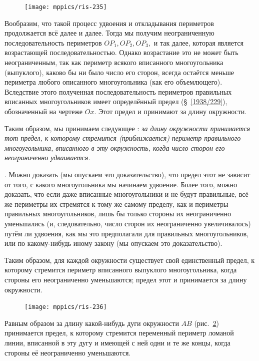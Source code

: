 \documentclass[oneside]{book}
\begin{document}
\begin{figure}[h!]
\centering
\texttt{[image: mppics/ris-235]}
\caption{}\label{1938/ris-235}
\end{figure}

Вообразим, что такой процесс удвоения и откладывания периметров продолжается всё далее и далее.
Тогда мы получим неограниченную последовательность периметров $OP_1, OP_2, OP_3,$ и так далее, которая является возрастающей последовательностью.
Однако возрастание это не может быть неограниченным, так как периметр всякого вписанного многоугольника (выпуклого), каково бы ни было число его сторон, всегда остаётся меньше периметра любого описанного многоугольника (как его объемлющего).
Вследствие этого полученная последовательность периметров правильных вписанных многоугольников имеет определённый предел (§~\ref{1938/229}), обозначенный на чертеже $Ox$.
Этот предел и принимают за длину окружности.

Таким образом, мы принимаем следующее :
\emph{за длину окружности принимается тот предел, к которому стремится (приближается) периметр правильного многоугольника, вписанного в эту окружность, когда число сторон его неограниченно удваивается.}

\smallskip
{}.
Можно доказать (мы опускаем это доказательство), что предел этот не зависит от того, с какого многоугольника мы начинаем удвоение.
Более того, можно доказать, что если даже вписанные многоугольники и не будут правильные, всё же периметры их стремятся к тому же самому пределу, как и периметры правильных многоугольников, лишь бы только стороны их неограниченно уменьшались (и, следовательно, число сторон их неограниченно увеличивалось) путём ли удвоения, как мы это предполагали для правильных многоугольников, или по какому-нибудь иному закону (мы опускаем это доказательство).

Таким образом, для каждой окружности существует свой единственный предел, к которому стремится периметр вписанного выпуклого многоугольника, когда стороны его неограниченно уменьшаются;
предел этот и принимается за длину окружности.

\begin{figure}
\centering
\texttt{[image: mppics/ris-236]}
\caption{}\label{1938/ris-236}
\end{figure}

Равным образом за длину какой-нибудь дуги окружности $AB$ (рис.~\ref{1938/ris-236}) принимается предел, к которому стремится переменный периметр ломаной линии, вписанной в эту дугу и имеющей с ней одни и те же концы, когда стороны её неограниченно уменьшаются.
\end{document}

